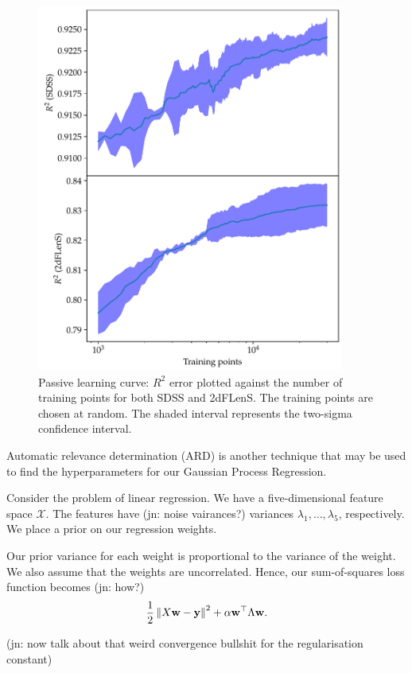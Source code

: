 \documentclass[11pt,twoside,openright]{report}
\newcommand\bw{\mathbf{w}}
\newcommand\by{\mathbf{y}}
\newcommand\cX{\mathcal{X}}
\newcommand\norm[1]{\left\|#1\right\|}
\newcommand\jn[1]{{\color{red}(jn: #1)}}
\begin{document}
  \begin{figure}
    \centering
    \includegraphics[width=0.9\textwidth]{passive_r2.pdf}
    \caption{Passive learning curve: $R^2$ error plotted against the number of training points for both SDSS and 2dFLenS. The training points are chosen at random. The shaded interval represents the two-sigma confidence interval.}
    \label{fig:passive_r2}
  \end{figure}

Automatic relevance determination (ARD) is another technique that may be used to find the hyperparameters for our Gaussian Process Regression.

Consider the problem of linear regression. We have a five-dimensional feature space $\cX$. The features have \jn{noise vairances?} variances $\lambda_1, \dots, \lambda_5$, respectively. We place a prior on our regression weights.

Our prior variance for each weight is proportional to the variance of the weight. We also assume that the weights are uncorrelated. Hence, our sum-of-squares loss function becomes \jn{how?}\[
    \frac12\norm{X\bw - \by}^2 + \alpha \bw^\top \Lambda \bw \text.
\]

\jn{now talk about that weird convergence bullshit for the regularisation constant}
\end{document}
